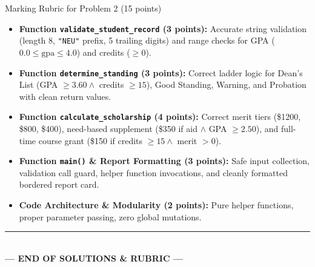 \documentclass[11pt,a4paper]{article}
\begin{document}
\newpage

\begin{solbox}{Marking Rubric for Problem 2 (15 points)}
\small
\begin{itemize}[leftmargin=2em, itemsep=3pt]
  \item \textbf{Function \texttt{validate\_student\_record} (3 points):} Accurate string validation (length 8, \texttt{"NEU"} prefix, 5 trailing digits) and range checks for GPA ($0.0 \le \text{gpa} \le 4.0$) and credits ($\ge 0$).
  \item \textbf{Function \texttt{determine\_standing} (3 points):} Correct ladder logic for Dean's List (GPA $\ge 3.60 \land$ credits $\ge 15$), Good Standing, Warning, and Probation with clean return values.
  \item \textbf{Function \texttt{calculate\_scholarship} (4 points):} Correct merit tiers (\$1200, \$800, \$400), need-based supplement (\$350 if aid $\land$ GPA $\ge 2.50$), and full-time course grant (\$150 if credits $\ge 15 \land$ merit $> 0$).
  \item \textbf{Function \texttt{main()} \& Report Formatting (3 points):} Safe input collection, validation call guard, helper function invocations, and cleanly formatted bordered report card.
  \item \textbf{Code Architecture \& Modularity (2 points):} Pure helper functions, proper parameter passing, zero global mutations.
\end{itemize}
\end{solbox}

\vfill
\begin{center}
  \rule{0.5\textwidth}{0.4pt}\\[1mm]
  \textbf{\color{primaryblue}--- END OF SOLUTIONS \& RUBRIC ---}
\end{center}
\end{document}
